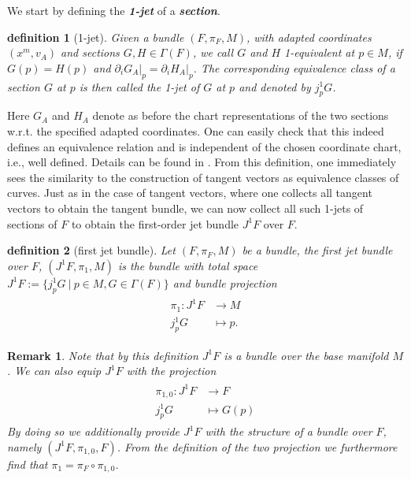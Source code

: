 \documentclass[a4paper,12pt, DIV=14, BCOR=5mm, twoside, headsepline, numbers=noenddot]{scrbook}
\newtheorem{definition}{definition}[section]
\newtheorem*{remark}{Remark}
\begin{document}
We start by defining the \textbf{\textit{1-jet}} of a \textbf{\textit{section}}.
\begin{definition}[1-jet] 
Given a bundle $(F, \pi_F, M)$, with adapted coordinates $(x^m, v_A)$ and sections $G,H \in \Gamma(F)$, we call $G$ and $H$ 1-equivalent at $p \in M$, if $G(p) = H(p)$ and $\partial_i G_A \vert_p = \partial_i H_A \vert_p$. The corresponding equivalence class of a section $G$ at $p$ is then called the 1-jet of $G$ at $p$ and denoted by $j^1_pG$.
\end{definition}
Here $G_A$ and $H_A$ denote as before the chart representations of the two sections w.r.t. the specified adapted coordinates. One can easily check that this indeed defines an equivalence relation and is independent of the chosen coordinate chart, i.e., well defined. Details can be found in \cite{saunders_1989}. From this definition, one immediately sees the similarity to the construction of tangent vectors as equivalence classes of curves. Just as in the case of tangent vectors, where one collects all tangent vectors to obtain the tangent bundle, we can now collect all such 1-jets of sections of $F$ to obtain the first-order jet bundle $J^1F$ over $F$. 
\begin{definition}[first jet bundle]
Let $(F, \pi_F, M)$ be a bundle, the first jet bundle over $F$, $(J^1F,\pi_1,M)$ is the bundle with total space $J^1F := \{j^1_pG \ \vert \  p \in M, G \in \Gamma(F)\}$ and bundle projection 
\begin{align}
    \begin{aligned}
\pi_1 : J^1F &\longrightarrow M \\
j^1_pG &\longmapsto p.
    \end{aligned}
\end{align}
\end{definition}
\begin{remark}
Note that by this definition $J^1F$ is a bundle over the base manifold $M$. We can also equip $J^1F$ with the projection 
\begin{align}
    \begin{aligned}
    \pi_{1,0} : J^1F &\longrightarrow F \\
    j^1_pG &\longmapsto G(p)
    \end{aligned}
\end{align}
By doing so we additionally provide $J^1F$ with the structure of a bundle over $F$, namely $(J^1F,\pi_{1,0},F)$. From the definition of the two projection we furthermore find that $\pi_1 = \pi_F \circ \pi_{1,0}$. 
\end{remark}
\end{document}
